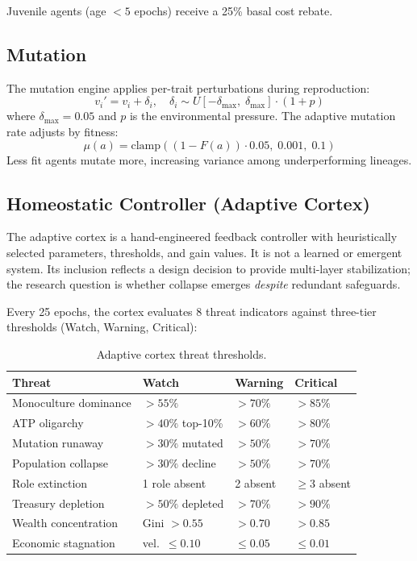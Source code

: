 \documentclass[11pt,a4paper]{article}
\begin{document}
Juvenile agents (age $< 5$ epochs) receive a 25\% basal cost rebate.

\subsection{Mutation}

The mutation engine applies per-trait perturbations during reproduction:
\begin{equation}
  v_i' = v_i + \delta_i, \quad \delta_i \sim U[-\delta_{\max},\; \delta_{\max}] \cdot (1 + p)
\end{equation}
where $\delta_{\max} = 0.05$ and $p$ is the environmental pressure. The adaptive mutation rate adjusts by fitness:
\begin{equation}
  \mu(a) = \text{clamp}\!\left((1 - F(a)) \cdot 0.05,\; 0.001,\; 0.1\right)
\end{equation}
Less fit agents mutate more, increasing variance among underperforming lineages.

\subsection{Homeostatic Controller (Adaptive Cortex)}

The adaptive cortex is a hand-engineered feedback controller with heuristically selected parameters, thresholds, and gain values. It is not a learned or emergent system. Its inclusion reflects a design decision to provide multi-layer stabilization; the research question is whether collapse emerges \emph{despite} redundant safeguards.

Every 25 epochs, the cortex evaluates 8 threat indicators against three-tier thresholds (Watch, Warning, Critical):

\begin{table}[H]
\centering
\caption{Adaptive cortex threat thresholds.}
\small
\begin{tabular}{@{}llll@{}}
\toprule
Threat & Watch & Warning & Critical \\
\midrule
Monoculture dominance & ${>}55\%$ & ${>}70\%$ & ${>}85\%$ \\
ATP oligarchy & ${>}40\%$ top-10\% & ${>}60\%$ & ${>}80\%$ \\
Mutation runaway & ${>}30\%$ mutated & ${>}50\%$ & ${>}70\%$ \\
Population collapse & ${>}30\%$ decline & ${>}50\%$ & ${>}70\%$ \\
Role extinction & 1 role absent & 2 absent & $\geq$3 absent \\
Treasury depletion & ${>}50\%$ depleted & ${>}70\%$ & ${>}90\%$ \\
Wealth concentration & Gini ${>}0.55$ & ${>}0.70$ & ${>}0.85$ \\
Economic stagnation & vel.\ $\leq 0.10$ & $\leq 0.05$ & $\leq 0.01$ \\
\bottomrule
\end{tabular}
\end{table}
\end{document}
